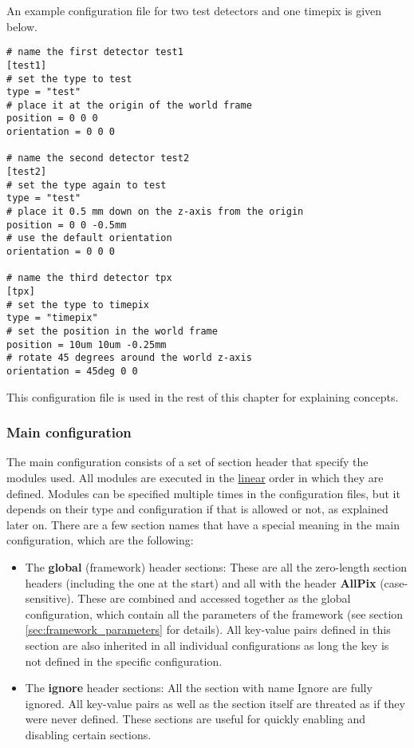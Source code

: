 An example configuration file for two test detectors and one timepix is given below. 
\begin{verbatim}
# name the first detector test1
[test1]
# set the type to test
type = "test"
# place it at the origin of the world frame
position = 0 0 0
orientation = 0 0 0

# name the second detector test2
[test2]
# set the type again to test
type = "test"
# place it 0.5 mm down on the z-axis from the origin
position = 0 0 -0.5mm
# use the default orientation
orientation = 0 0 0

# name the third detector tpx
[tpx]
# set the type to timepix
type = "timepix"
# set the position in the world frame
position = 10um 10um -0.25mm
# rotate 45 degrees around the world z-axis
orientation = 45deg 0 0
\end{verbatim}
This configuration file is used in the rest of this chapter for explaining concepts. 

\subsubsection{Main configuration}
\label{sec:main_config}
The main configuration consists of a set of section header that specify the modules used. All modules are executed in the \underline{linear} order in which they are defined. Modules can be specified multiple times in the configuration files, but it depends on their type and configuration if that is allowed or not, as explained later on. There are a few section names that have a special meaning in the main configuration, which are the following:
\begin{itemize}
\item The \textbf{global} (framework) header sections: These are all the zero-length section headers (including the one at the start) and all with the header \textbf{AllPix} (case-sensitive). These are combined and accessed together as the global configuration, which contain all the parameters of the framework (see section \ref{sec:framework_parameters} for details). All key-value pairs defined in this section are also inherited in all individual configurations as long the key is not defined in the specific configuration.
\item The \textbf{ignore} header sections: All the section with name Ignore are fully ignored. All key-value pairs as well as the section itself are threated as if they were never defined. These sections are useful for quickly enabling and disabling certain sections.
\end{itemize}


